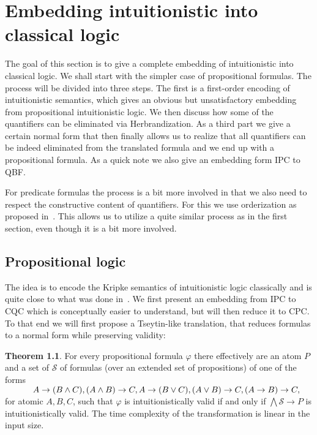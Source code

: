 \documentclass[a4paper,12pt]{report}
\theoremstyle{definition}
\newtheorem{theorem}{Theorem}[section]
\theoremstyle{definition}
\theoremstyle{definition}
\theoremstyle{definition}
\theoremstyle{definition}
\theoremstyle{definition}
\theoremstyle{definition}
\begin{document}
	\chapter{Embedding intuitionistic into classical logic}
	
	The goal of this section is to give a complete embedding of intuitionistic into classical logic. We shall start with the simpler case of propositional formulas. The process will be divided into three steps. The first is a first-order encoding of intuitionistic semantics, which gives an obvious but unsatisfactory embedding from propositional intuitionistic logic. We then discuss how some of the quantifiers can be eliminated via Herbrandization. As a third part we give a certain normal form that then finally allows us to realize that all quantifiers can be indeed eliminated from the translated formula and we end up with a propositional formula. As a quick note we also give an embedding form IPC to QBF.
	
	For predicate formulas the process is a bit more involved in that we also need to respect the constructive content of quantifiers. For this we use orderization as proposed in~\cite{iemhoff2010eskolemization}. This allows us to utilize a quite similar process as in the first section, even though it is a bit more involved.
	
	\section{Propositional logic}
	
	The idea is to encode the Kripke semantics of intuitionistic logic classically and is quite close to what was done in~\cite{iemhoff2010eskolemization}. We first present an embedding from IPC to CQC which is conceptually easier to understand, but will then reduce it to CPC. To that end we will first propose a Tseytin-like translation, that reduces formulas to a normal form while preserving validity:
	
	\begin{theorem}\label{thm:Tseytin}
		For every propositional formula $\varphi$ there effectively are an atom $P$ and a set of $\mathcal S$ of formulas (over an extended set of propositions) of one of the forms\\
		$\text{ \hspace{1cm}} A\to (B\wedge C), (A\wedge B)\to C, A\to (B\vee C), (A\vee B)\to C, (A\to B)\to C,$\\
		for atomic $A, B, C$, such that $\varphi$ is intuitionistically valid if and only if $\bigwedge\mathcal S\to P$ is intuitionistically valid. The time complexity of the transformation is linear in the input size.
	\end{theorem}
	
\end{document}
